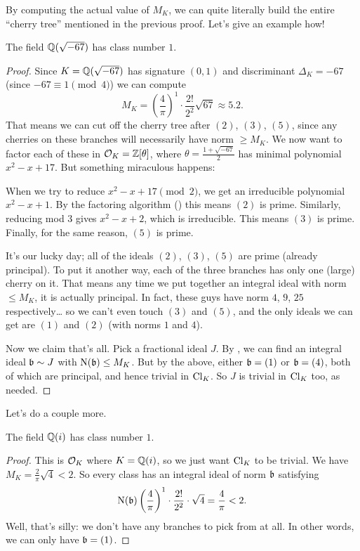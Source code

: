 By computing the actual value of $M_K$,
we can quite literally build the entire ``cherry tree'' mentioned in the previous proof.
Let's give an example how!
\begin{proposition}
	The field $\mathbb Q(\sqrt{-67})$ has class number $1$.
\end{proposition}
\begin{proof}
	Since $K = \mathbb Q(\sqrt{-67})$ has signature $(0,1)$
	and discriminant $\Delta_K = -67$ (since $-67 \equiv 1 \pmod 4$)
	we can compute
	\[ M_K = \left( \frac 4\pi \right)^{1} \cdot \frac{2!}{2^2} \sqrt{67} \approx 5.2. \]
	That means we can cut off the cherry tree after $(2)$, $(3)$, $(5)$, since any
	cherries on these branches will necessarily have norm $\ge M_K$.
	We now want to factor each of these in $\mathcal O_K = \mathbb Z[\theta]$, where $\theta = \frac{1+\sqrt{-67}}{2}$
	has minimal polynomial $x^2 - x + 17$.
	But something miraculous happens:
	\begin{itemize}
		\ii When we try to reduce $x^2-x+17 \pmod 2$, we get an irreducible polynomial $x^2-x+1$.
		By the factoring algorithm () this means $(2)$ is prime.
		\ii Similarly, reducing mod $3$ gives $x^2-x+2$, which is irreducible.
		This means $(3)$ is prime.
		\ii Finally, for the same reason, $(5)$ is prime.
	\end{itemize}
	It's our lucky day;
	all of the ideals $(2)$, $(3)$, $(5)$ are prime (already principal).
	To put it another way,
	each of the three branches has only one (large) cherry on it.
	That means any time we put together an integral ideal with norm $\le M_K$,
	it is actually principal.
	In fact, these guys have norm $4$, $9$, $25$ respectively\dots
	so we can't even touch $(3)$ and $(5)$,
	and the only ideals we can get are $(1)$ and $(2)$ (with norms $1$ and $4$).

	Now we claim that's all.
	Pick a fractional ideal $J$.
	By ,
	we can find an integral ideal $\mathfrak b \sim J$ with $\operatorname{N}(\mathfrak b) \le M_K$.
	But by the above, either $\mathfrak b = (1)$ or $\mathfrak b = (4)$, both of which are principal,
	and hence trivial in $\mathrm{Cl}_K$.
	So $J$ is trivial in $\mathrm{Cl}_K$ too, as needed.
\end{proof}
Let's do a couple more.
\begin{theorem}
	The field $\mathbb Q(i)$ has class number $1$.
\end{theorem}
\begin{proof}
	This is $\mathcal O_K$ where $K = \mathbb Q(i)$, so we just want $\mathrm{Cl}_K$ to be trivial.
	We have $M_K = \frac{2}{\pi}\sqrt{4} < 2$.
	So every class
	has an integral ideal of norm $\mathfrak b$ satisfying
	\[ 
		\operatorname{N}(\mathfrak b)
		\left( \frac4\pi \right)^{1} \cdot \frac{2!}{2^2} \cdot \sqrt{4}
		= \frac4\pi < 2. 
	\]
	Well, that's silly: we don't have any branches to pick from at all.
	In other words, we can only have $\mathfrak b = (1)$.
\end{proof}

